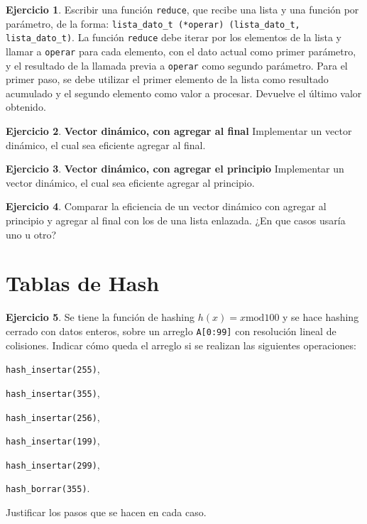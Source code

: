 \documentclass[11pt,a4paper]{article}
\theoremstyle{definition}
\newtheorem{ejercicio}{Ejercicio}[section]
\begin{document}
\begin{ejercicio}
Escribir una función \lstinline!reduce!, que recibe una lista y una función por
parámetro, de la forma: \lstinline!lista_dato_t (*operar) (lista_dato_t, lista_dato_t)!. La
función \lstinline!reduce! debe iterar por los elementos de la lista y
llamar a \lstinline!operar! para cada elemento, con el dato actual como
primer parámetro, y el resultado de la llamada previa a \lstinline!operar!
como segundo parámetro. Para el primer paso, se debe utilizar el primer
elemento de la lista como resultado acumulado y el segundo elemento
como valor a procesar. Devuelve el último valor obtenido.
\end{ejercicio}

\begin{ejercicio}
\textbf{Vector dinámico, con agregar al final} Implementar un vector dinámico,
el cual sea eficiente agregar al final.
\end{ejercicio}

\begin{ejercicio}
\textbf{Vector dinámico, con agregar el principio} Implementar un vector
dinámico, el cual sea eficiente agregar al principio.
\end{ejercicio}

\begin{ejercicio}
Comparar la eficiencia de un vector dinámico con agregar al principio y
agregar al final con los de una lista enlazada. ¿En que casos usaría uno u
otro?
\end{ejercicio}


\newpage
\section{Tablas de Hash}

\begin{ejercicio}
Se tiene la función de hashing $h(x)= x \textrm{mod} 100$ y se hace hashing cerrado
con datos enteros, sobre un arreglo \lstinline!A[0:99]! con resolución
lineal de colisiones. Indicar cómo queda  el arreglo si se realizan las
siguientes operaciones:
\begin{partes}
\item \lstinline!hash_insertar(255)!,
\item \lstinline!hash_insertar(355)!,
\item \lstinline!hash_insertar(256)!,
\item \lstinline!hash_insertar(199)!,
\item \lstinline!hash_insertar(299)!,
\item \lstinline!hash_borrar(355)!.
\end{partes}
Justificar los pasos que se hacen en cada caso.
\end{ejercicio}
\end{document}
